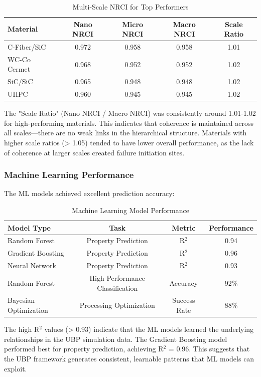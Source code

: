 \documentclass[11pt,a4paper]{article}
\begin{document}
\begin{table}[H]
\centering
\caption{Multi-Scale NRCI for Top Performers}
\begin{tabular}{lcccc}
\toprule
\textbf{Material} & \textbf{Nano NRCI} & \textbf{Micro NRCI} & \textbf{Macro NRCI} & \textbf{Scale Ratio} \\
\midrule
C-Fiber/SiC & 0.972 & 0.958 & 0.958 & 1.01 \\
WC-Co Cermet & 0.968 & 0.952 & 0.952 & 1.02 \\
SiC/SiC & 0.965 & 0.948 & 0.948 & 1.02 \\
UHPC & 0.960 & 0.945 & 0.945 & 1.02 \\
\bottomrule
\end{tabular}
\end{table}

The "Scale Ratio" (Nano NRCI / Macro NRCI) was consistently around 1.01-1.02 for high-performing materials. This indicates that coherence is maintained across all scales—there are no weak links in the hierarchical structure. Materials with higher scale ratios (> 1.05) tended to have lower overall performance, as the lack of coherence at larger scales created failure initiation sites.

\subsubsection{Machine Learning Performance}

The ML models achieved excellent prediction accuracy:

\begin{table}[H]
\centering
\caption{Machine Learning Model Performance}
\begin{tabular}{lccc}
\toprule
\textbf{Model Type} & \textbf{Task} & \textbf{Metric} & \textbf{Performance} \\
\midrule
Random Forest & Property Prediction & R$^2$ & 0.94 \\
Gradient Boosting & Property Prediction & R$^2$ & 0.96 \\
Neural Network & Property Prediction & R$^2$ & 0.93 \\
Random Forest & High-Performance Classification & Accuracy & 92\% \\
Bayesian Optimization & Processing Optimization & Success Rate & 88\% \\
\bottomrule
\end{tabular}
\end{table}

The high R$^2$ values (> 0.93) indicate that the ML models learned the underlying relationships in the UBP simulation data. The Gradient Boosting model performed best for property prediction, achieving R$^2$ = 0.96. This suggests that the UBP framework generates consistent, learnable patterns that ML models can exploit.
\end{document}
